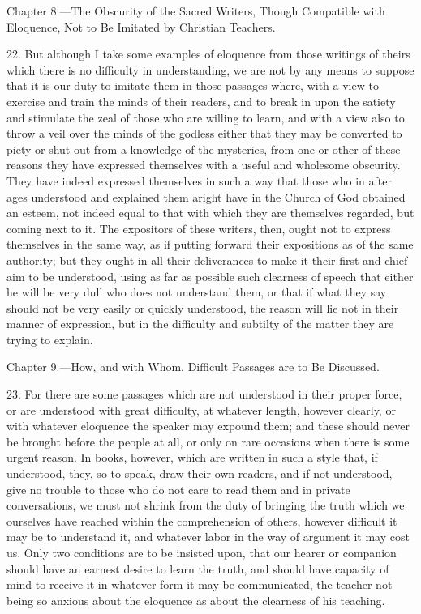 
Chapter 8.—The Obscurity of the Sacred Writers, Though Compatible with Eloquence, Not to Be Imitated by Christian Teachers.

22. But although I take some examples of eloquence from those writings of theirs which there is no difficulty in understanding, we are not by any means to suppose that it is our duty to imitate them in those passages where, with a view to exercise and train the minds of their readers, and to break in upon the satiety and stimulate the zeal of those who are willing to learn, and with a view also to throw a veil over the minds of the godless either that they may be converted to piety or shut out from a knowledge of the mysteries, from one or other of these reasons they have expressed themselves with a useful and wholesome obscurity. They have indeed expressed themselves in such a way that those who in after ages understood and explained them aright have in the Church of God obtained an esteem, not indeed equal to that with which they are themselves regarded, but coming next to it. The expositors of these writers, then, ought not to express themselves in the same way, as if putting forward their expositions as of the same authority; but they ought in all their deliverances to make it their first and chief aim to be understood, using as far as possible such clearness of speech that either he will be very dull who does not understand them, or that if what they say should not be very easily or quickly understood, the reason will lie not in their manner of expression, but in the difficulty and subtilty of the matter they are trying to explain.


Chapter 9.—How, and with Whom, Difficult Passages are to Be Discussed.

23. For there are some passages which are not understood in their proper force, or are understood with great difficulty, at whatever length, however clearly, or with whatever eloquence the speaker may expound them; and these should never be brought before the people at all, or only on rare occasions when there is some urgent reason. In books, however, which are written in such a style that, if understood, they, so to speak, draw their own readers, and if not understood, give no trouble to those who do not care to read them and in private conversations, we must not shrink from the duty of bringing the truth which we ourselves have reached within the comprehension of others, however difficult it may be to understand it, and whatever labor in the way of argument it may cost us. Only two conditions are to be insisted upon, that our hearer  or companion should have an earnest desire to learn the truth, and should have capacity of mind to receive it in whatever form it may be communicated, the teacher not being so anxious about the eloquence as about the clearness of his teaching.

